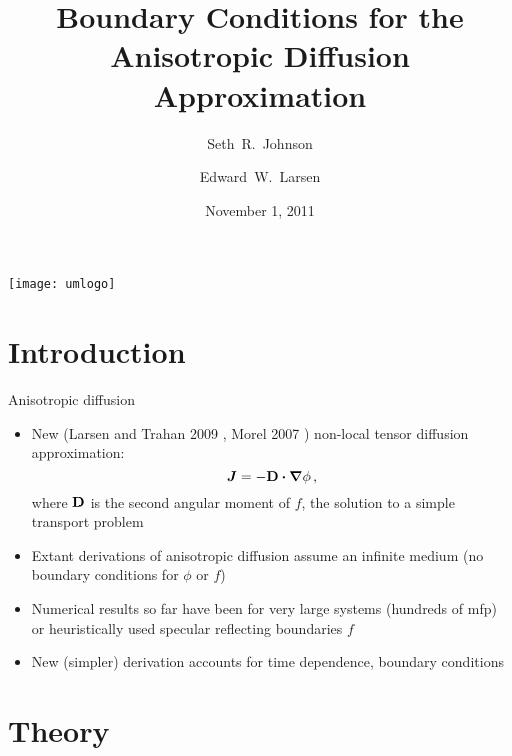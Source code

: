 \documentclass{beamer}
\title[AD BCs]%
{Boundary Conditions for the Anisotropic Diffusion Approximation}
\author[SRJ, EWL]{Seth~R.~Johnson \and Edward~W.~Larsen}
\institute[UMich]{
University of Michigan, Ann Arbor
}
\date[11/1/2011]{November 1, 2011}
\begin{document}

\begin{frame}
\titlepage
\begin{center}
  \texttt{[image: umlogo]}
\end{center}
\end{frame}

\section{Introduction}
\begin{frame}{Anisotropic diffusion}
  \begin{itemize}
    \item New (Larsen and Trahan 2009 \cite{Lar2009c}, Morel 2007
      \cite{Mor2007}) non-local tensor diffusion approximation:
      \begin{equation*}
        \bm{J} = - \mathbf{D} \bm{\cdot} \bm{\nabla} \phi \,,
      \end{equation*}
      where $\mathbf{D}$ is the second angular moment of $f$, the solution to a
      simple transport problem
    \item Extant derivations of anisotropic diffusion assume an infinite medium
      (no boundary conditions for $\phi$ or $f$)
    \item Numerical results so far have been for very large systems (hundreds of
      mfp) \cite{Lar2009c,Joh2011} or heuristically used specular reflecting
      boundaries $f$ \cite{Tra2011}
    \item New (simpler) derivation accounts for time dependence,
      boundary conditions
  \end{itemize}
\end{frame}

\section{Theory}

\end{document}
